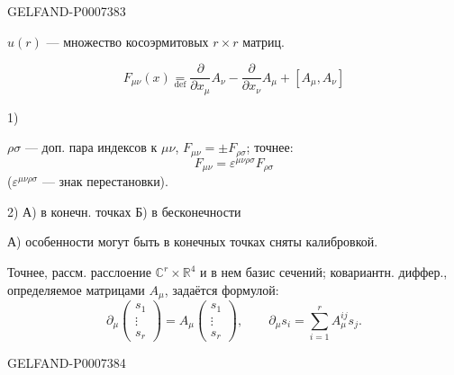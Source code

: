 \begin{GelfandAdjacentEvidence}{GELFAND-P000738}{3}

\(u(r)\) --- множество косоэрмитовых \(r\times r\) матриц.

\begin{equation*}
\tag*{(1)\hfill}
F_{\mu\nu}(x)\underset{\mathrm{def}}{=}
\frac{\partial}{\partial x_\mu}A_\nu
-\frac{\partial}{\partial x_\nu}A_\mu+[A_\mu,A_\nu]
\end{equation*}

1) 

\(\rho\sigma\) --- доп. пара индексов к \(\mu\nu\), \quad \(F_{\mu\nu}=\pm F_{\rho\sigma}\); точнее:
\begin{equation*}
\tag*{(2)\hfill}
F_{\mu\nu}=\varepsilon^{\mu\nu\rho\sigma}F_{\rho\sigma}
\end{equation*}
(\(\varepsilon^{\mu\nu\rho\sigma}\) --- знак перестановки).

2)  \quad А) в конечн. точках \quad Б) в бесконечности

А) особенности могут быть в конечных точках сняты калибровкой.

Точнее, рассм. расслоение \(\mathbb C^r\times\mathbb R^4\) и в нем базис сечений;
ковариантн. диффер., определяемое матрицами \(A_\mu\), задаётся формулой:
\begin{equation*}
\tag*{(3)\hfill}
\partial_\mu\begin{pmatrix}s_1\\ \vdots\\ s_r\end{pmatrix}
=A_\mu\begin{pmatrix}s_1\\ \vdots\\ s_r\end{pmatrix},
\qquad
\partial_\mu s_i=\sum_{i=1}^{r}A_\mu^{ij}s_j.
\end{equation*}
\end{GelfandAdjacentEvidence}
\begin{GelfandAdjacentEvidence}{GELFAND-P000738}{4}

\end{GelfandAdjacentEvidence}
